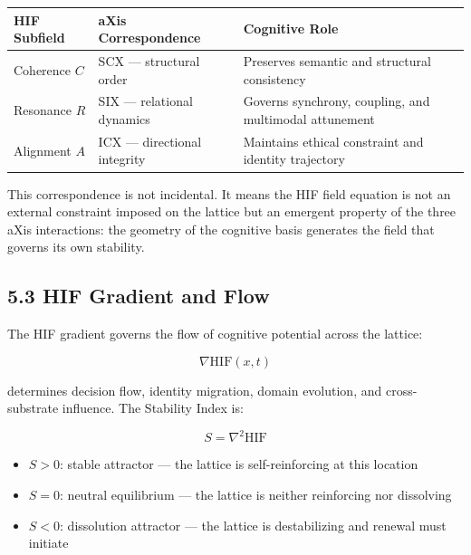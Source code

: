 {\def\LTcaptype{none} %
\begin{longtable}[]{@{}
  >{\raggedright\arraybackslash}p{}
  >{\raggedright\arraybackslash}p{}
  >{\raggedright\arraybackslash}p{}@{}}
\toprule\noalign{}
\begin{minipage}[b]{\linewidth}\raggedright
HIF Subfield
\end{minipage} & \begin{minipage}[b]{\linewidth}\raggedright
aXis Correspondence
\end{minipage} & \begin{minipage}[b]{\linewidth}\raggedright
Cognitive Role
\end{minipage} \\
\midrule\noalign{}
\endhead
\bottomrule\noalign{}
\endlastfoot
Coherence \(C\) & SCX --- structural order & Preserves semantic and structural consistency \\
Resonance \(R\) & SIX --- relational dynamics & Governs synchrony, coupling, and multimodal attunement \\
Alignment \(A\) & ICX --- directional integrity & Maintains ethical constraint and identity trajectory \\
\end{longtable}
}

This correspondence is not incidental. It means the HIF field equation is not an external constraint imposed on the lattice but an emergent property of the three aXis interactions: the geometry of the cognitive basis generates the field that governs its own stability.

\subsection{5.3 HIF Gradient and Flow}\label{hif-gradient-and-flow}

The HIF gradient governs the flow of cognitive potential across the lattice:

\[
\nabla \mathrm{HIF}(x,t)
\]

determines decision flow, identity migration, domain evolution, and cross-substrate influence. The Stability Index is:

\[
S = \nabla^2 \mathrm{HIF}
\]

\begin{itemize}
\tightlist
\item
  \(S > 0\): stable attractor --- the lattice is self-reinforcing at this location
\item
  \(S = 0\): neutral equilibrium --- the lattice is neither reinforcing nor dissolving
\item
  \(S < 0\): dissolution attractor --- the lattice is destabilizing and renewal must initiate
\end{itemize}

